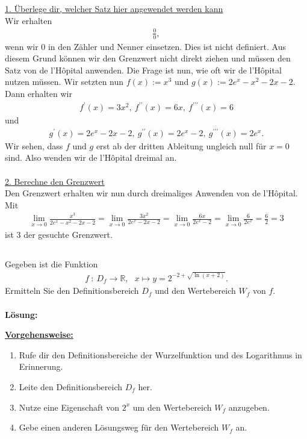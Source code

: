 \underline{1. Überlege dir, welcher Satz hier angewendet werden kann}\\
Wir erhalten 
\begin{align*}
\frac{0}{0},
\end{align*}
wenn wir $0$ in den Zähler und Nenner einsetzen.
Dies ist nicht definiert. 
Aus diesem Grund können wir den Grenzwert nicht direkt ziehen und müssen den Satz von de l'H\^{o}pital anwenden.
Die Frage ist nun, wie oft wir de l'H\^{o}pital nutzen müssen.
Wir setzten nun $f(x) := x^3$ und 
$g(x):= 2e^x -x^2 -2x -2$.
Dann erhalten wir
\begin{align*}
f^\prime (x) =3 x^2 , \ f^{\prime \prime}(x) = 6x ,\
f^{\prime \prime \prime}(x) = 6
\end{align*}
und
\begin{align*}
g^\prime (x) = 2e^x -2x -2, \ g^{\prime \prime}(x) = 2e^x -2 , \
g^{\prime \prime \prime}(x) = 2 e^x.
\end{align*}  
Wir sehen, dass $f$ und $g$ erst ab der dritten Ableitung ungleich null für $x = 0 $ sind.
Also wenden wir de l'H\^{o}pital dreimal an.
\\
\\
\underline{2. Berechne den Grenzwert}\\
Den Grenzwert erhalten wir nun durch dreimaliges Anwenden von de l'H\^{o}pital.
Mit
\begin{align*}
\lim \limits_{x \rightarrow 0} \frac{x^3}{2e^x-x^2-2x-2}
= \lim \limits_{x \rightarrow 0} \frac{3x^2}{2e^x-2x -2}
=\lim \limits_{x \rightarrow 0} \frac{6x}{2e^x-2}
= \lim \limits_{x \rightarrow 0} \frac{6}{2e^x}
=\frac{6}{2	} = 3
\end{align*}
ist $3$ der gesuchte Grenzwert.

\newpage

\subsection*{}
Gegeben ist die Funktion
\begin{align*}
f \ : \ D_f \to \mathbb{R}, \ \ \
x \mapsto y = 2^{-2 + \sqrt{\ln(x+2)}}. 
\end{align*}
Ermitteln Sie den Definitionsbereich $D_f$ und den Wertebereich $W_f$ von $f$.\\
\\
\textbf{Lösung:}
\begin{mdframed}
\underline{\textbf{Vorgehensweise:}}
\begin{enumerate}
\item Rufe dir den Definitionsbereiche der Wurzelfunktion und des Logarithmus in Erinnerung.
\item Leite den Definitionsbereich $D_f$ her.
\item Nutze eine Eigenschaft von $2^x$ um den Wertebereich $W_f$ anzugeben.
\item Gebe einen anderen Lösungsweg für den Wertebereich $W_f$ an.
\end{enumerate}
\end{mdframed}

